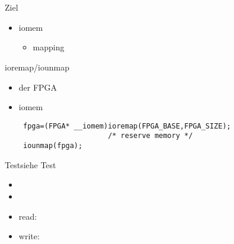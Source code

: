 \section{}
\begin{frame}{Ziel}{}
 \begin{itemize}
  \item iomem
  \begin{itemize}
   \item  mapping
  \end{itemize}
 \end{itemize}
\end{frame}

\begin{frame}[fragile]{ioremap/iounmap}
\begin{itemize}
 \item der  FPGA
 \item iomem
\begin{lstlisting}
 fpga=(FPGA* __iomem)ioremap(FPGA_BASE,FPGA_SIZE); 
                     /* reserve memory */
 iounmap(fpga);
\end{lstlisting}
\end{itemize}
\end{frame}

\begin{frame}{Test}{siehe  Test}
 \begin{itemize}
  \item {}
  \item {}
  \item read: 
  \item write:
 \end{itemize}
\end{frame}
